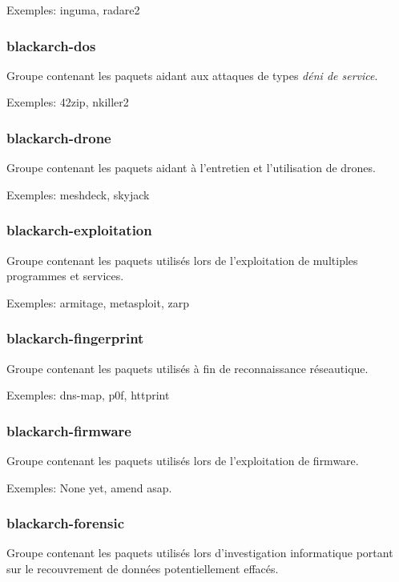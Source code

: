 \documentclass[a4paper, oneside, 11pt]{book}
\begin{document}
Exemples: inguma, radare2

\subsubsection{blackarch-dos}

Groupe contenant les paquets aidant aux attaques de types \textit{déni de service}.

Exemples: 42zip, nkiller2

\subsubsection{blackarch-drone}

Groupe contenant les paquets aidant à l'entretien et l'utilisation de drones.

Exemples: meshdeck, skyjack

\subsubsection{blackarch-exploitation}

Groupe contenant les paquets utilisés lors de l'exploitation de multiples
programmes et services.

Exemples: armitage, metasploit, zarp

\subsubsection{blackarch-fingerprint}

Groupe contenant les paquets utilisés à fin de reconnaissance réseautique.

Exemples: dns-map, p0f, httprint

\subsubsection{blackarch-firmware}

Groupe contenant les paquets utilisés lors de l'exploitation de firmware.

Exemples: None yet, amend asap.

\subsubsection{blackarch-forensic}

Groupe contenant les paquets utilisés lors d'investigation informatique portant
sur le recouvrement de données potentiellement effacés.
\end{document}
